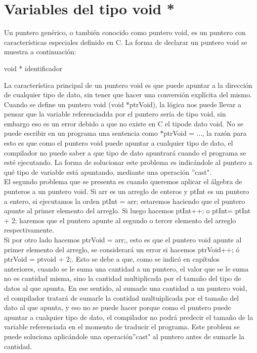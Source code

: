 \documentclass[12pt ]{article}
\begin{document}
\section{Variables del tipo void *}
Un puntero genérico, o también conocido como puntero void, es un puntero con características especiales definido en C.
La forma de declarar un puntero void se muestra a continuación:
\begin{center}
	void * identificador
\end{center}
La característica principal de un puntero void es que puede apuntar a la dirección de cualquier tipo de dato, sin tener que hacer una conversión explícita del mismo.\\
Cuando se define un puntero void (void *ptrVoid), la lógica nos puede llevar a pensar que la variable referenciadda por el puntero sería de tipo void, sin embargo eso es un error debido a que no existe en C el tipode dato void. No se puede escribir en un programa una sentencia como *ptrVoid = ..., la razón para esto es que como el puntero void puede apuntar a cualquier tipo de dato, el compilador no puede saber a que tipo de dato apuntrará cuando el programa se esté ejecutando. La forma de solucionar este problema es indicándole al puntero a qué tipo de variable está apuntando, mediante una operación ''cast".\\
El segundo problema que se presenta es cuando queremos aplicar el álgebra de punteros a un puntero void. Si arr es un arreglo de enteros y ptInt es un puntero a entero, si ejecutamos la orden ptInt = arr; estaremos haciendo que el puntero apunte al primer elemento del arreglo. Si luego hacemos ptInt++; o ptInt= ptInt + 2; haremos que el puntero apunte al segundo o tercer elemento del arreglo respectivamente.\\

Si por otro lado hacemos ptrVoid = arr;, esto es que el puntero void apunte al primer elemento del arreglo, se considerará un error si hacemos ptrVoid++; ó ptrVoid = ptvoid + 2;. Esto se debe a que, como se indicó en capítulos anteriores, cuando se le suma una cantidad a un puntero, el valor que se le suma no es cantidad misma, sino la cantidad multiplicada por el tamaño del tipo de datos al que apunta. En ese sentido, al sumarle una cantidad a un puntero void, el compilador tratará de sumarle la contidad multuiplicada por el tamaño del dato al que apunta, y eso no se puede hacer porque como el puntero puede apuntar a cualquier tipo de dato, el compilador no podrá predecir el tamaño de la variable referenciada en el momento de traducir el programa. Este problem se puede soluciona aplicándole una operación''cast" al puntero antes de sumarle la cantidad.\\
\end{document}
